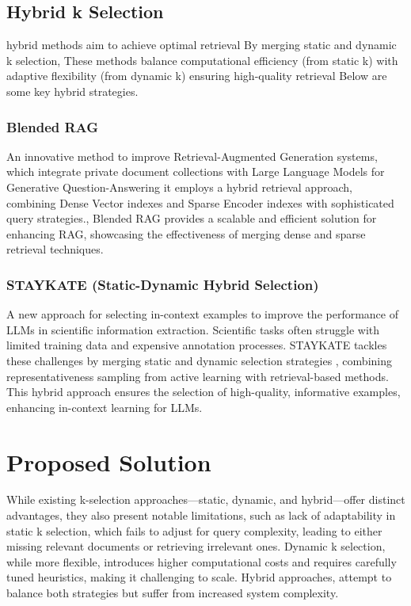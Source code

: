 \subsection{Hybrid k Selection}
hybrid methods aim to achieve optimal retrieval By merging static and dynamic k selection, These methods balance computational efficiency (from static k) with adaptive flexibility (from dynamic k) ensuring high-quality retrieval Below are some key hybrid strategies.

\subsubsection{Blended RAG} 
An innovative method to improve Retrieval-Augmented Generation systems, which integrate private document collections with Large Language Models for Generative Question-Answering it employs a hybrid retrieval approach, combining Dense Vector indexes and Sparse Encoder indexes with sophisticated query strategies\citep{sawarkar2024blendedragimprovingrag}., Blended RAG provides a scalable and efficient solution for enhancing RAG, showcasing the effectiveness of merging dense and sparse retrieval techniques.

\subsubsection{ STAYKATE (Static-Dynamic Hybrid Selection)}
A new approach for selecting in-context examples to improve the performance of LLMs in scientific information extraction. Scientific tasks often struggle with limited training data and expensive annotation processes. STAYKATE tackles these challenges by merging static and dynamic selection strategies \citep{zhu2024staykatehybridincontextexample}, combining representativeness sampling from active learning with retrieval-based methods. This hybrid approach ensures the selection of high-quality, informative examples, enhancing in-context learning for LLMs.
\section{Proposed Solution}
While existing k-selection approaches—static, dynamic, and hybrid—offer distinct advantages, they also present notable limitations, such as lack of adaptability in static k selection, which fails to adjust for query complexity, leading to either missing relevant documents or retrieving irrelevant ones. Dynamic k selection, while more flexible, introduces higher computational costs and requires carefully tuned heuristics, making it challenging to scale. Hybrid approaches, attempt to balance both strategies but suffer from increased system complexity.

